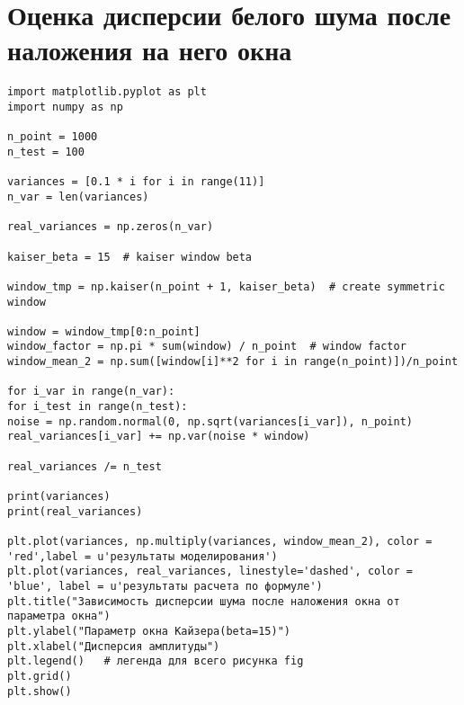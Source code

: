 \chapter{Оценка дисперсии белого шума после наложения на него окна}\label{app:Г}
\begin{lstlisting}
import matplotlib.pyplot as plt
import numpy as np

n_point = 1000
n_test = 100

variances = [0.1 * i for i in range(11)]
n_var = len(variances)

real_variances = np.zeros(n_var)

kaiser_beta = 15  # kaiser window beta

window_tmp = np.kaiser(n_point + 1, kaiser_beta)  # create symmetric window

window = window_tmp[0:n_point]
window_factor = np.pi * sum(window) / n_point  # window factor
window_mean_2 = np.sum([window[i]**2 for i in range(n_point)])/n_point

for i_var in range(n_var):
for i_test in range(n_test):
noise = np.random.normal(0, np.sqrt(variances[i_var]), n_point)
real_variances[i_var] += np.var(noise * window)

real_variances /= n_test

print(variances)
print(real_variances)

plt.plot(variances, np.multiply(variances, window_mean_2), color = 'red',label = u'результаты моделирования')
plt.plot(variances, real_variances, linestyle='dashed', color = 'blue', label = u'результаты расчета по формуле')
plt.title("Зависимость дисперсии шума после наложения окна от параметра окна")
plt.ylabel("Параметр окна Кайзера(beta=15)")
plt.xlabel("Дисперсия амплитуды")
plt.legend()   # легенда для всего рисунка fig
plt.grid()
plt.show()
\end{lstlisting}

